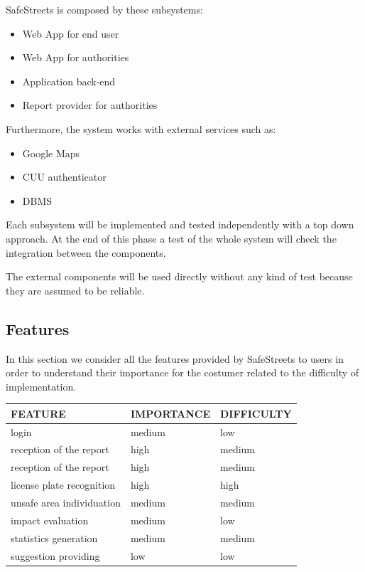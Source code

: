 SafeStreets is composed by these subsystems:
\begin{itemize}
	\item 
	Web App for end user
	\item 
	Web App for authorities
	\item 
	Application back-end
	\item 
	Report provider for authorities
\end{itemize}
Furthermore, the system works with external services such as:
\begin{itemize}
	\item 
	Google Maps 
	\item 
	CUU authenticator
	\item 
	DBMS
\end{itemize}

Each subsystem will be implemented and tested independently with a top down approach. At the end of this phase a test of the whole system will check the integration between the components. 

The external components will be used directly without any kind of test because they are assumed to be reliable.

\subsection{Features}

In this section we consider all the features provided by SafeStreets to users in order to understand their importance for the costumer related to the difficulty of implementation.

\begin{center}
	\begin{tabular}{ | p{6cm} | p{3.5cm} |p{3cm}|} 
		\hline
		FEATURE & IMPORTANCE & DIFFICULTY  \\ 
		\hline
		login & medium & low  \\ 
		\hline
		reception of the report  & high & medium  \\ 
		\hline
		reception of the report  & high & medium  \\ 
		\hline
		license plate recognition & high & high \\ 
		\hline
		unsafe area individuation & medium & medium \\ 
		\hline
		impact evaluation & medium & low \\ 
		\hline
		statistics generation & medium & medium \\ 
		\hline
		suggestion providing & low & low \\ 
		\hline
	\end{tabular}
\end{center}

